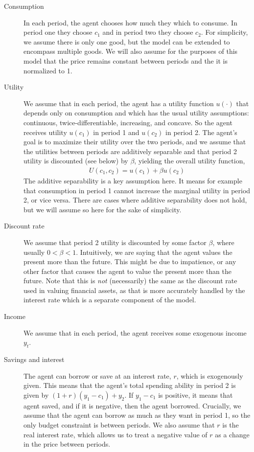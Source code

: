 \begin{description}
    \item[Consumption] In each period, the agent chooses how much they which to consume. In period one they choose $c_1$ and in period two they choose $c_2$. For simplicity, we assume there is only one good, but the model can be extended to encompass multiple goods. We will also assume for the purposes of this model that the price remains constant between periods and the it is normalized to 1. 
    \item[Utility] We assume that in each period, the agent has a utility function $u(\cdot)$ that depends only on consumption and which has the usual utility assumptions: continuous, twice-differentiable, increasing, and concave. So the agent receives utility $u(c_1)$ in period 1 and $u(c_2)$ in period 2. The agent's goal is to maximize their utility over the two periods, and we assume that the utilities between periods are additively separable and that period 2 utility is discounted (see below) by $\beta$, yielding the overall utility function,
    \begin{align*}
        U(c_1, c_2) = u(c_1) + \beta u(c_2)
    \end{align*} 
    The additive separability is a key assumption here. It means for example that consumption in period 1 cannot increase the marginal utility in period 2, or vice versa. There are cases where additive separability does not hold, but we will assume so here for the sake of simplicity.
    \item[Discount rate] We assume that period 2 utility is discounted by some factor $\beta$, where usually $0 < \beta < 1$. Intuitively, we are saying that the agent values the present more than the future. This might be due to impatience, or any other factor that causes the agent to value the present more than the future. Note that this is \emph{not} (necessarily) the same as the discount rate used in valuing financial assets, as that is more accurately handled by the interest rate which is a separate component of the model. 
    \item[Income] We assume that in each period, the agent receives some exogenous income $y_t$. 
    \item[Savings and interest] The agent can borrow or save at an interest rate, $r$, which is exogenously given. This means that the agent's total spending ability in period 2 is given by $(1 + r)(y_1 - c_1) + y_2$. If $y_1 - c_1$ is positive, it means that agent saved, and if it is negative, then the agent borrowed. Crucially, we assume that the agent can borrow as much as they want in period 1, so the only budget constraint is between periods. We also assume that $r$ is the real interest rate, which allows us to treat a negative value of $r$ as a change in the price between periods. 

\end{description}
